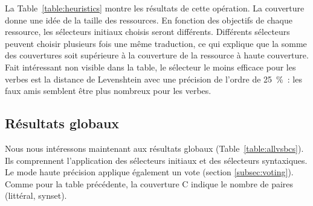 La Table~\ref{table:heuristics} montre les résultats de cette opération. La
couverture donne une idée de la taille des ressources. En fonction des
objectifs de chaque ressource, les sélecteurs initiaux choisis seront
différents. Différents sélecteurs peuvent choisir plusieurs fois une même
traduction, ce qui explique que la somme des couvertures soit supérieure à la
couverture de la ressource à haute couverture. Fait intéressant non visible
dans la table, le sélecteur le moins efficace pour les verbes est la distance
de Levenshtein avec une précision de l'ordre de 25~\%~: les faux amis semblent
être plus nombreux pour les verbes.


\subsection{Résultats globaux}
\label{subsec:allvsbcs}

Nous nous intéressons maintenant aux résultats globaux
(Table~\ref{table:allvsbcs}). Ils comprennent l'application des sélecteurs
initiaux et des sélecteurs syntaxiques. Le mode haute précision applique
également un vote (section \ref{subsec:voting}). Comme pour la table
précédente, la couverture C indique le nombre de paires (littéral, synset).

